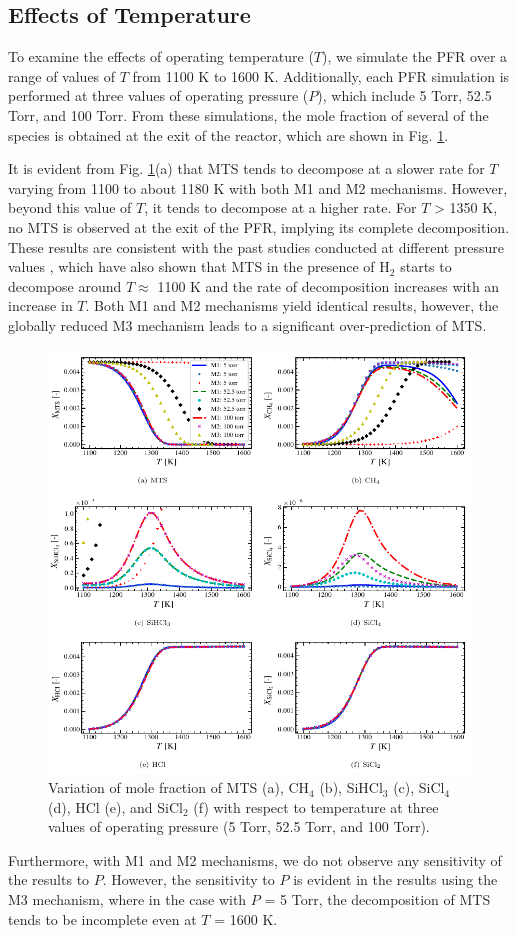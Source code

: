 \documentclass[final, letterpaper, square, comma, numbers, sort&compress]{elsarticle}
\begin{document}
\subsection{Effects of Temperature}
\label{S:4.1}
To examine the effects of operating temperature ($T$), we simulate the PFR over a range of values of $T$ from 1100 K to 1600 K. Additionally, each PFR simulation is performed at three values of operating pressure ($P$), which include 5 Torr, 52.5 Torr, and 100 Torr. From these simulations, the mole fraction of several of the species is obtained at the exit of the reactor, which are shown in Fig. \ref{fig:6}.

It is evident from Fig. \ref{fig:6}(a) that MTS tends to decompose at a slower rate for $T$ varying from 1100 to about 1180 K with both M1 and M2 mechanisms. However, beyond this value of $T$, it tends to decompose at a higher rate. For $T$ > 1350 K, no MTS is observed at the exit of the PFR, implying its complete decomposition. These results are consistent with the past studies conducted at different pressure values \cite{Dang2022,Peng2021,Yang2009}, which have also shown that MTS in the presence of H$_2$ starts to decompose around $T\approx$ 1100 K and the rate of decomposition increases with an increase in $T$. Both M1 and M2 mechanisms yield identical results, however, the globally reduced M3 mechanism leads to a significant over-prediction of MTS.
\begin{figure}[p]
    \centering\includegraphics[width=\textwidth]{ph-fig6.png}
    \caption{Variation of mole fraction of MTS (a), CH$_4$ (b), SiHCl$_3$ (c), SiCl$_4$ (d), HCl (e), and SiCl$_2$ (f) with respect to temperature at three values of operating pressure (5 Torr, 52.5 Torr, and 100 Torr).}
    \label{fig:6}
\end{figure}
Furthermore, with M1 and M2 mechanisms, we do not observe any sensitivity of the results to $P$. However, the sensitivity to $P$ is evident in the results using the M3 mechanism, where in the case with $P$ = 5 Torr, the decomposition of MTS tends to be incomplete even at $T$ = 1600 K.
\end{document}
